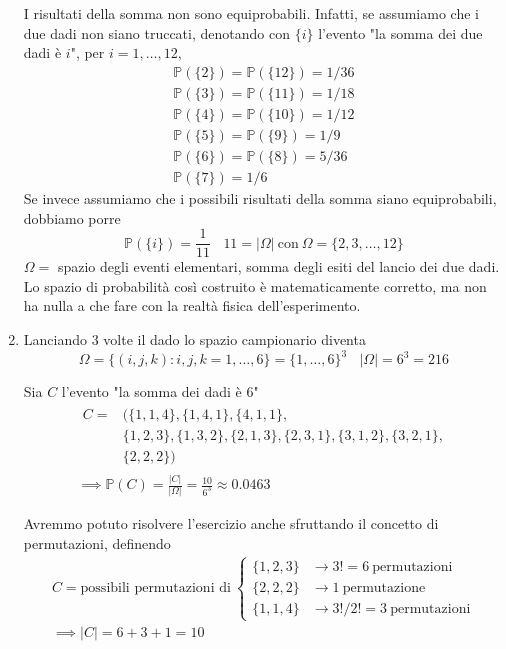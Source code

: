 \begin{enumerate}
\begin{oss}
I risultati della somma non sono equiprobabili. Infatti, se assumiamo che i due dadi non siano truccati, denotando con $\{i\}$ l'evento "la somma dei due dadi è $i$", per $i=1,\dotsc ,12$,\begin{equation*}
\begin{array}{ l }
\mathbb{P}(\{2\}) =\mathbb{P}(\{12\}) =1/36\\
\mathbb{P}(\{3\}) =\mathbb{P}(\{11\}) =1/18\\
\mathbb{P}(\{4\}) =\mathbb{P}(\{10\}) =1/12\\
\mathbb{P}(\{5\}) =\mathbb{P}(\{9\}) =1/9\\
\mathbb{P}(\{6\}) =\mathbb{P}(\{8\}) =5/36\\
\mathbb{P}(\{7\}) =1/6
\end{array}
\end{equation*}Se invece assumiamo che i possibili risultati della somma siano equiprobabili, dobbiamo porre\begin{equation*}
\mathbb{P}(\{i\}) =\frac{1}{11} \ \ \ \ 11=| \Omega | \ \text{con} \ \Omega =\{2,3,\dotsc ,12\}
\end{equation*}$\Omega =$ spazio degli eventi elementari, somma degli esiti del lancio dei due dadi. Lo spazio di probabilità così costruito è matematicamente corretto, ma non ha nulla a che fare con la realtà fisica dell'esperimento.
\end{oss}
\item Lanciando $3$ volte il dado lo spazio campionario diventa\begin{equation*}
\Omega =\{( i,j,k) :i,j,k=1,\dotsc ,6\} =\{1,\dotsc ,6\}^{3} \ \ \ \ | \Omega | =6^{3} =216
\end{equation*}

Sia $C$ l'evento "la somma dei dadi è $6$"\begin{gather*}
\begin{aligned}
C= & (\{1,1,4\} ,\{1,4,1\} ,\{4,1,1\} ,\\
 & \{1,2,3\} ,\{1,3,2\} ,\{2,1,3\} ,\{2,3,1\} ,\{3,1,2\} ,\{3,2,1\} ,\\
 & \{2,2,2\})
\end{aligned}\\
\mathbb{\implies P}( C) =\frac{| C| }{| \Omega | } =\frac{10}{6^{3}} \approx 0.0463
\end{gather*}

\begin{oss}
Avremmo potuto risolvere l'esercizio anche sfruttando il concetto di permutazioni, definendo\begin{gather*}
C=\text{possibili permutazioni di} \ \begin{cases}
\{1,2,3\} & \rightarrow 3!=6\ \text{permutazioni}\\
\{2,2,2\} & \rightarrow 1\ \text{permutazione}\\
\{1,1,4\} & \rightarrow 3!/2!=3\ \text{permutazioni}
\end{cases}\\
\implies | C| =6+3+1=10
\end{gather*}
\end{oss}
\end{enumerate}
\Soluzione

